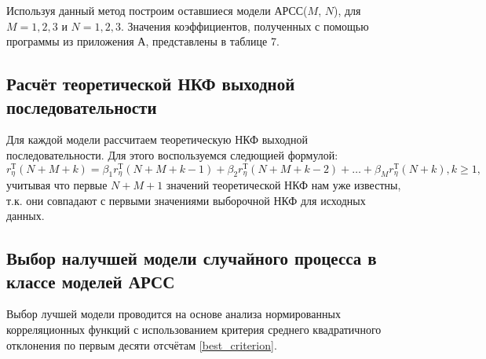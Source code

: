 \documentclass[12pt, fleqn]{article}
\begin{document}
{{{					Используя данный метод построим оставшиеся модели АРСС($M$, $N$), для $M = 1, 2, 3$ и $N = 1, 2, 3$. Значения коэффициентов, полученных с помощью программы из приложения А, представлены в таблице 7.
		}
		\subsection{Расчёт теоретической НКФ выходной последовательности} {
			Для каждой модели рассчитаем теоретическую НКФ выходной последовательности. Для этого воспользуемся следющией формулой:
			\begin{equation}
				r_\eta^\text{Т}(N + M + k) = \beta_1 r_\eta^\text{Т}(N + M + k - 1) + \beta_2 r_\eta^\text{Т}(N + M + k - 2) + \dots + \beta_M r^\text{Т}_\eta(N + k), k \geq 1,
			\end{equation}
			учитывая что первые $N + M + 1$ значений теоретической НКФ нам уже известны, т.к. они совпадают с первыми значениями выборочной НКФ для исходных данных.
		}
		\subsection{Выбор налучшей модели случайного процесса в классе моделей АРСС} {
			Выбор лучшей модели проводится на основе анализа нормированных корреляционных функций с использованием критерия среднего квадратичного отклонения по первым десяти отсчётам \eqref{best_criterion}. \medskip
					
}}}
\end{document}
